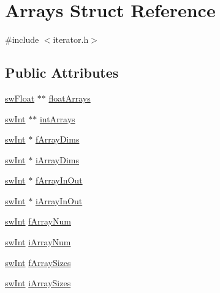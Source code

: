 \hypertarget{structArrays}{}\section{Arrays Struct Reference}
\label{structArrays}


{\ttfamily \#include $<$iterator.\+h$>$}

\subsection*{Public Attributes}
\begin{DoxyCompactItemize}
\item 
\mbox{\hyperlink{include_2swMacro_8h_a4ce60b1aa82e56b7372553a6a5bf2c0b}{sw\+Float}} $\ast$$\ast$ \mbox{\hyperlink{structArrays_acc1c5c8b920ed82b661c62dae59c1d87}{float\+Arrays}}
\item 
\mbox{\hyperlink{include_2swMacro_8h_a113cf5f6b5377cdf3fac6aa4e443e9aa}{sw\+Int}} $\ast$$\ast$ \mbox{\hyperlink{structArrays_a3b8e8309d07651cb70a0a694855b804f}{int\+Arrays}}
\item 
\mbox{\hyperlink{include_2swMacro_8h_a113cf5f6b5377cdf3fac6aa4e443e9aa}{sw\+Int}} $\ast$ \mbox{\hyperlink{structArrays_a0ea463f279710afff06ffd4856406338}{f\+Array\+Dims}}
\item 
\mbox{\hyperlink{include_2swMacro_8h_a113cf5f6b5377cdf3fac6aa4e443e9aa}{sw\+Int}} $\ast$ \mbox{\hyperlink{structArrays_ac5691bcdd36e5def106b308f553ef714}{i\+Array\+Dims}}
\item 
\mbox{\hyperlink{include_2swMacro_8h_a113cf5f6b5377cdf3fac6aa4e443e9aa}{sw\+Int}} $\ast$ \mbox{\hyperlink{structArrays_a6bbf2ee6da277e3e2c780689fef08768}{f\+Array\+In\+Out}}
\item 
\mbox{\hyperlink{include_2swMacro_8h_a113cf5f6b5377cdf3fac6aa4e443e9aa}{sw\+Int}} $\ast$ \mbox{\hyperlink{structArrays_a0ff37b5ccb44cb2a3c6929764ddc2abe}{i\+Array\+In\+Out}}
\item 
\mbox{\hyperlink{include_2swMacro_8h_a113cf5f6b5377cdf3fac6aa4e443e9aa}{sw\+Int}} \mbox{\hyperlink{structArrays_a7ca77e28c268df2e7cb626afbeb005df}{f\+Array\+Num}}
\item 
\mbox{\hyperlink{include_2swMacro_8h_a113cf5f6b5377cdf3fac6aa4e443e9aa}{sw\+Int}} \mbox{\hyperlink{structArrays_a22a0a6af8c0a698bc7840bf1e9837db9}{i\+Array\+Num}}
\item 
\mbox{\hyperlink{include_2swMacro_8h_a113cf5f6b5377cdf3fac6aa4e443e9aa}{sw\+Int}} \mbox{\hyperlink{structArrays_a0f0308c0b53408426cfc6d036f9f72d0}{f\+Array\+Sizes}}
\item 
\mbox{\hyperlink{include_2swMacro_8h_a113cf5f6b5377cdf3fac6aa4e443e9aa}{sw\+Int}} \mbox{\hyperlink{structArrays_af5b71d24c66f1248b65dabc348773efa}{i\+Array\+Sizes}}
\end{DoxyCompactItemize}


